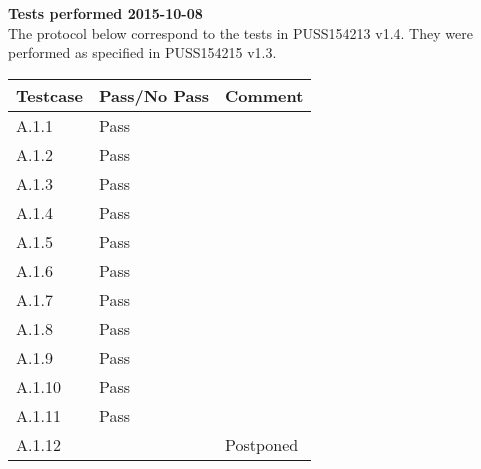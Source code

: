 \renewcommand{\testdate}{2015-10-08}
\textbf{ Tests performed \testdate} \\
The protocol below correspond to the tests in PUSS154213 v1.4. They were performed as specified in PUSS154215 v1.3.
\begin{center}
  		\begin{tabular}{| p{3cm} | p{5cm} | p{5cm} |}
    		\hline
	    	\textbf{Testcase}			& \textbf{Pass/No Pass} 	& \textbf{Comment} \\ \hline
    		A.1.1		 						& Pass  										&   \\ \hline
    		A.1.2		 						& Pass 										& 				 \\	\hline
    		A.1.3		 						& Pass 										& 				 \\	\hline
    		A.1.4		 						& Pass 										& 				 \\	\hline
    		A.1.5		 						& Pass 										& 				 \\	\hline
    		A.1.6		 						& Pass 										& 				 \\	\hline
    		A.1.7		 						& Pass 										& 				 \\	\hline
    		A.1.8		 						& Pass 										& 				 \\	\hline
    		A.1.9		 						& Pass 										& 				 \\	\hline
    		A.1.10	 							& Pass 										& 				 \\	\hline
    		A.1.11	 							& Pass 										& 				 \\	\hline
    		A.1.12								&											& Postponed		 \\ \hline
 		 \end{tabular}
\end{center}
	